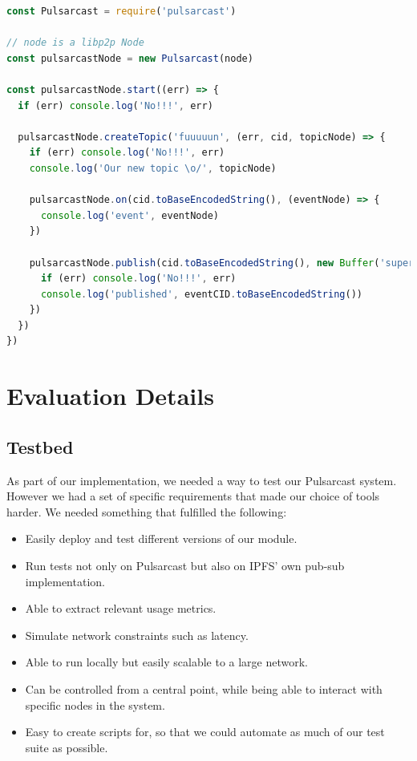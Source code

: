 \begin{lstlisting}[language=JavaScript, float=h, caption={Usage example of our Pulsarcast module},label={pulsarcast-usage-example}]
const Pulsarcast = require('pulsarcast')

// node is a libp2p Node
const pulsarcastNode = new Pulsarcast(node)

const pulsarcastNode.start((err) => {
  if (err) console.log('No!!!', err)
  
  pulsarcastNode.createTopic('fuuuuun', (err, cid, topicNode) => {
    if (err) console.log('No!!!', err)
    console.log('Our new topic \o/', topicNode)
    
    pulsarcastNode.on(cid.toBaseEncodedString(), (eventNode) => {
      console.log('event', eventNode)
    })
    
    pulsarcastNode.publish(cid.toBaseEncodedString(), new Buffer('super fun!'), (err, eventCID) => {
      if (err) console.log('No!!!', err)
      console.log('published', eventCID.toBaseEncodedString())
    })
  })
})
\end{lstlisting}

\section{Evaluation Details}
\label{ap:evaluation-details}

\subsection{Testbed}
\label{ap:sub:testbed}
As part of our implementation, we needed a way to test our Pulsarcast system.
However we had a set of specific requirements that made our choice of tools
harder. We needed something that fulfilled the following:

\begin{itemize}
  \item Easily deploy and test different versions of our module.
  \item Run tests not only on Pulsarcast but also on IPFS' own pub-sub
    implementation.
  \item Able to extract relevant usage metrics.
  \item Simulate network constraints such as latency.
  \item Able to run locally but easily scalable to a large network.
  \item Can be controlled from a central point, while being able to interact
    with specific nodes in the system.
  \item Easy to create scripts for, so that we could automate as much of our
    test suite as possible.
\end{itemize}

